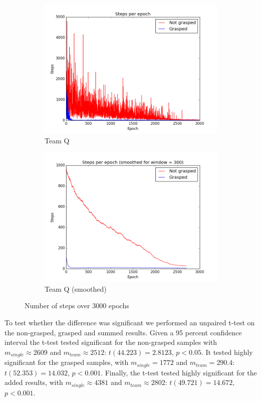 \begin{figure}
\begin{subfigure}{.48\textwidth}
		\includegraphics[width=\textwidth]{images/TeamQ.png}
		\caption{Team Q}
	\end{subfigure}
	\begin{subfigure}{0.48\textwidth}
		\centering
		\includegraphics[width=\textwidth]{images/TeamQ_smoothed.png}
		\caption{Team Q (smoothed)}
	\end{subfigure}
	\caption{Number of steps over 3000 epochs}
	\label{fig:Results1}
\end{figure}

To test whether the difference was significant we performed an unpaired t-test on the non-grasped, grasped and summed results. Given a 95 percent confidence interval the t-test tested significant for the non-grasped samples with $m_{single} \approx 2609$ and $m_{team} \approx 2512$: $t(44.223) = 2.8123$, $p < 0.05$. It tested highly significant for the grasped samples, with $m_{single} = 1772$ and $m_{team} = 290.4$: $t(52.353) = 14.032$, $p<0.001$. Finally, the t-test tested highly significant for the added results, with $m_{single} \approx 4381$ and $m_{team} \approx 2802$: $t(49.721) = 14.672$, $p < 0.001$. 

